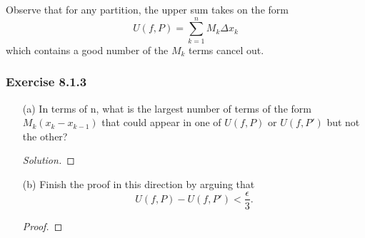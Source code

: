 Observe that for any partition, the upper sum takes on the form 
\[  U(f,P) = \sum_{ k=1 }^{ n } M_{k } \Delta x_{k } \] which contains a good number of the \( M_{k }  \) terms cancel out.
\subsubsection{Exercise 8.1.3 } 
\begin{enumerate}
    \item[(a)] In terms of n, what is the largest number of terms of the form \( M_{k} ( x_{k } - x_{k-1} ) \) that could appear in one of \( U(f,P)  \) or \( U(f,P') \) but not the other?
        \begin{proof}[Solution]
        
        \end{proof}
    \item[(b)] Finish the proof in this direction by arguing that 
        \[  U(f,P) - U(f,P') < \frac{ \epsilon  }{ 3 }. \]
        \begin{proof}
        
        \end{proof}
\end{enumerate}




